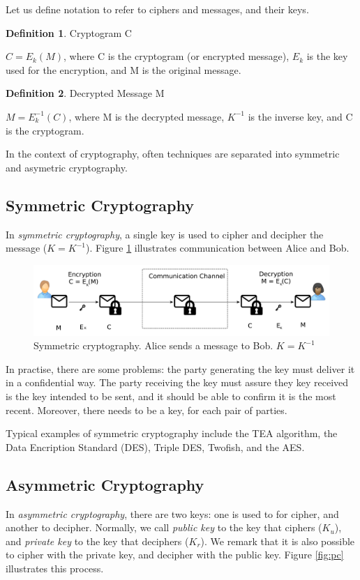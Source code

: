 \documentclass[12pt,a4paper]{article}
\theoremstyle{definition}
\newtheorem{definition}{Definition}[section]
\begin{document}
Let us define notation to refer to ciphers and messages, and their keys.

\theoremstyle{definition}
\begin{definition}{Cryptogram C}

$C = E_k(M)$, where C is the cryptogram (or encrypted message), $E_k$ is the key used for the encryption, and M is the original message. 
\end{definition}

\begin{definition}{Decrypted Message M}

$M = E_k^{-1}(C)$, where M is the decrypted message, $K^{-1}$ is the inverse key, and C is the cryptogram. 
\end{definition}

In the context of cryptography, often techniques are separated into symmetric and asymetric cryptography.

\subsection{Symmetric Cryptography}
In \emph{symmetric cryptography}, a single key is used to cipher and decipher the message ($K = K^{-1}$). Figure \ref{fig:sc} illustrates communication between Alice and Bob. 

\begin{figure}[h]
    \centering
    \includegraphics[scale=0.4]{figures/lab2_sc.pdf}
    \caption{Symmetric cryptography. Alice sends a message to Bob. $K = K^{-1}$}
    \label{fig:sc}
\end{figure}

In practise, there are some problems: the party generating the key must deliver it in a confidential way. The party receiving the key must assure they key received is the key intended to be sent, and it should be able to confirm it is the most recent. Moreover, there needs to be a key, for each pair of parties. 

Typical examples of symmetric cryptography include the TEA algorithm, the Data Encription Standard (DES), Triple DES, Twofish, and the AES.

\subsection{Asymmetric Cryptography}
In \emph{asymmetric cryptography}, there are two keys: one is used to for cipher, and another to decipher. Normally, we call \emph{public key} to the key that ciphers ($K_u$), and \emph{private key} to the key that deciphers ($K_r$). We remark that it is also possible to cipher with the private key, and decipher with the public key. Figure \ref{fig:pc} illustrates this process.
\end{document}
